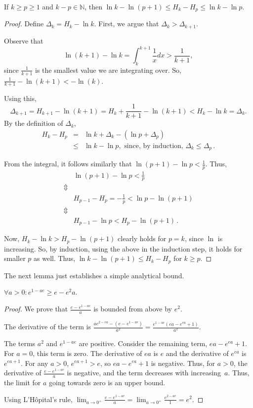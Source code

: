 \documentclass[a4paper,UKenglish,cleveref, autoref, thm-restate]{lipics-v2021}
\newcommand{\NAT}{\ensuremath{\mathbb{N}}}
\begin{document}
\begin{lemma}
\label{lemma-harmonic}
If $k \geq p \geq 1$ and $k-p\in\NAT$, then
$\ln k - \ln(p+1) \leq H_k - H_p \leq \ln k - \ln p$.
\end{lemma}
\begin{proof}
  Define $\Delta_k = H_k - \ln k$.  First, we argue that
  $\Delta_k > \Delta_{k+1}$.

Observe that
\[
\ln(k+1) - \ln k = \int_k^{k+1} \frac{1}{x}dx > \frac{1}{k+1},
\]
since $\frac{1}{k+1}$ is the smallest value we are integrating over.
So, $\frac{1}{k+1}-\ln(k+1) < -\ln(k)$.

Using this,
\[\Delta_{k+1}=H_{k+1}-\ln(k+1)=H_k+\frac{1}{k+1}-\ln(k+1)<H_k-\ln k=\Delta_k.\]
By the definition of $\Delta_k$,
\[
\begin{array}{rcl}
  H_k-H_p
  & = & \ln k + \Delta_k - (\ln p + \Delta_p) \\
  & \leq & \ln k - \ln p, \mbox{ since, by induction, $\Delta_k \leq \Delta_p$}\,.
\end{array}
\]

From the integral, it follows similarly that
$\ln(p+1)-\ln p < \frac{1}{p}$.  Thus,
\[\begin{array}{cl}
& \ln(p+1)-\ln p < \frac{1}{p} \\
\Updownarrow \\
& H_{p-1}-H_p=-\frac{1}{p} < \ln p - \ln(p+1) \\
\Updownarrow \\
& H_{p-1} - \ln p < H_p - \ln(p+1)\,.
\end{array}\]

Now, $H_k - \ln k > H_p - \ln(p+1)$ clearly holds for $p=k$, since
$\ln$ is increasing. So, by induction, using the above in the
induction step, it holds for smaller $p$ as well. Thus,
$\ln k - \ln(p+1) \leq H_k - H_p$ for $k\geq p$.
\end{proof}

The next lemma just establishes a simple analytical bound.
\begin{lemma}
\label{lemma-e-bound}
$\forall a > 0\colon e^{1-ae} \geq e - e^2a$.
\end{lemma}
\begin{proof}
  We prove that $\frac{e - e^{1-ae}}{a}$ is bounded from above by
  $e^2$.

  The derivative of the term is
  $\frac{ae^{2-ea}-(e-e^{1-ae})}{a^2} =
  \frac{e^{1-ae}(ea-e^{ea}+1)}{a^2}$.

  The terms $a^2$ and $e^{1-ae}$ are positive. Consider the remaining
  term, $ea-e^{ea}+1$. For $a=0$, this term is zero.  The derivative
  of $ea$ is $e$ and the derivative of $e^{ea}$ is $e^{ea+1}$.  For
  any $a > 0$, $e^{ea+1} > e$, so $ea-e^{ea}+1$ is negative.  Thus,
  for $a > 0$, the derivative of $\frac{e - e^{1-ae}}{a}$ is negative,
  and the term decreases with increasing~$a$.  Thus, the limit for $a$
  going towards zero is an upper bound.

  Using L'H\^{o}pital's rule,
  $ \lim_{a\rightarrow 0^{+}} \frac{e - e^{1-ae}}{a} =
  \lim_{a\rightarrow 0^{+}} \frac{e^{2-ae}}{1} = e^2.$
\end{proof}
\end{document}
